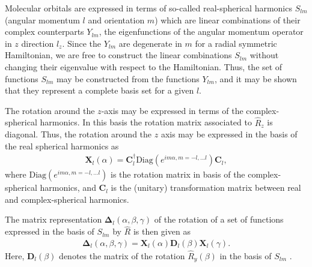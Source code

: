 Molecular orbitals are expressed in terms of so-called real-spherical harmonics $S_{lm}$ (angular momentum $l$
and orientation $m$) which are linear combinations of their complex counterparts $Y_{lm}$, the eigenfunctions
of the angular momentum operator in $z$ direction $\hat{l}_z$. Since the $Y_{lm}$ are degenerate in $m$ for a
radial symmetric Hamiltonian, we are free to construct the linear combinations $S_{lm}$ without changing their
eigenvalue with respect to the Hamiltonian. Thus, the set of functions $S_{lm}$ may be constructed from the
functions $Y_{lm}$, and it may be shown that they represent a complete basis set for a given $l$\cite{Blanco1997}.

The rotation around the $z$-axis may be expressed in terms of the complex-spherical harmonics. In this basis
the rotation matrix associated to $\hat{R}_z$ is diagonal. Thus, the rotation around the $z$ axis may be
expressed in the basis of the real spherical harmonics as
\begin{align}
  \pmb{X}_l(\alpha) = \pmb{C}_l^\dagger \mathrm{Diag}(e^{im\alpha,m=-l,...l})\pmb{C}_l,
\end{align}
where $\mathrm{Diag}(e^{im\alpha,m=-l,...l})$ is the rotation matrix in basis of the complex-spherical harmonics,
and $\pmb{C}_l$ is the (unitary) transformation matrix between real and complex-spherical harmonics.

The matrix representation $\pmb{\Delta}_l(\alpha,\beta,\gamma)$ of the rotation of a set of functions expressed in
the basis of $S_{lm}$ by $\hat{R}$ is then given as
\begin{align}
  \pmb{\Delta}_l(\alpha,\beta,\gamma) = \pmb{X}_l(\alpha) \pmb{D}_l(\beta) \pmb{X}_l(\gamma).
  \label{eq:GeneralRotationWigner}
\end{align}
Here, $\pmb{D}_l(\beta)$ denotes the matrix of the rotation $\hat{R}_y(\beta)$ in the basis of $S_{lm}$
\cite{Blanco1997}.

